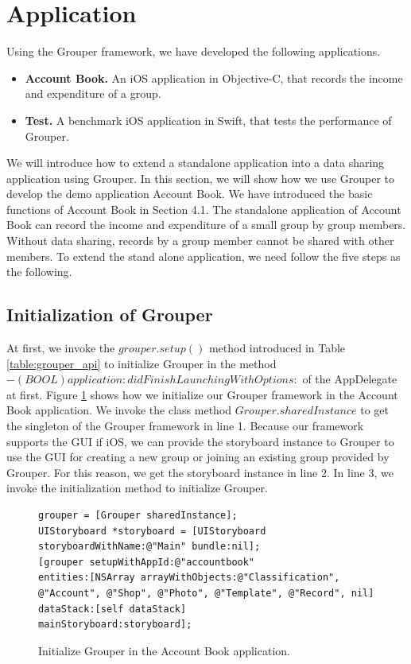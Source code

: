 \documentclass[a4paper,11pt]{report}
\begin{document}
\section{Application} \label{section:application}

Using the Grouper framework, we have developed the following applications. 

\begin{itemize}
	\setlength{\itemsep}{1pt}
	\setlength{\parskip}{0pt}
	\setlength{\parsep}{0pt}
	\item \textbf{Account Book.} An iOS application in Objective-C, that records the income and expenditure of a group.
	\item \textbf{Test.} A benchmark iOS application in Swift, that tests the performance of Grouper.
\end{itemize}

We will introduce how to extend a standalone application into a data sharing application using Grouper.
In this section, we will show how we use Grouper to develop the demo application Account Book.
We have introduced the basic functions of Account Book in Section 4.1.
The standalone application of Account Book can record the income and expenditure of a small group by group members.
Without data sharing, records by a group member cannot be shared with other members.
To extend the stand alone application, we need follow the five steps as the following.

\subsection{Initialization of Grouper}

At first, we invoke the $grouper.setup()$ method introduced in Table \ref{table:grouper_api} to initialize Grouper in the method $- (BOOL)application: didFinishLaunchingWithOptions:$ of the AppDelegate at first.
Figure \ref{fig:initialize_grouper} shows how we initialize our Grouper framework in the Account Book application.
We invoke the class method $Grouper.sharedInstance$ to get the singleton of the Grouper framework in line 1.
Because our framework supports the GUI if iOS, we can provide the storyboard instance to Grouper to use the GUI for creating a new group or joining an existing group provided by Grouper.
For this reason, we get the storyboard instance in line 2.
In line 3, we invoke the initialization method to initialize Grouper.

\begin{figure}
\begin{lstlisting}[frame=none language=Objective-C] 
grouper = [Grouper sharedInstance];
UIStoryboard *storyboard = [UIStoryboard storyboardWithName:@"Main" bundle:nil];
[grouper setupWithAppId:@"accountbook"
entities:[NSArray arrayWithObjects:@"Classification", @"Account", @"Shop", @"Photo", @"Template", @"Record", nil]
dataStack:[self dataStack]
mainStoryboard:storyboard];
\end{lstlisting}
\caption{Initialize Grouper in the Account Book application.}
\label{fig:initialize_grouper}
\end{figure}
\end{document}
